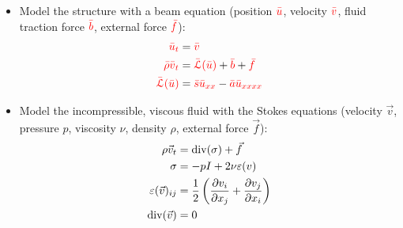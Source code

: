 \documentclass[
paperwidth=48in,paperheight=36in,
fontscale=0.4
]{baposter}
\begin{document}
\begin{poster}
{\begin{center}
\end{center}

\begin{itemize}
    \item Model the structure with a beam equation (position \({\color{red} \bar{u}}\),
          velocity \({\color{red} \bar{v}}\), fluid traction force \({\color{red} \bar{b}}\), external
          force \({\color{red} \bar{f}}\)):
          \begin{align*}
              {\color{red} \bar{u}}_{\color{red}t}              &= {\color{red} \bar{v}}              \\
              {\color{red} \bar{\rho}} {\color{red} \bar{v}}_{\color{red}t} &= {\color{red} \bar{\mathcal{L}}(\bar{u})} +
              {\color{red} \bar{b}} + {\color{red} \bar{f}}                                           \\
              {\color{red} \bar{\mathcal{L}}(\bar{u})}  &= {\color{red} \bar{s}} {\color{red} \bar{u}}_{\color{red}xx}
              - {\color{red} \bar{a}} {\color{red} \bar{u}}_{\color{red}xxxx}
          \end{align*}

    \item Model the incompressible, viscous fluid with the Stokes equations
          (velocity \(\vec{v}\), pressure \(p\), viscosity \(\nu\), density
          \(\rho\), external force \(\vec{f}\)):
          \begin{align*}
              \rho \vec{v}_t &= \mathrm{div}(\sigma) + \vec{f}                 \\
              \sigma &= -p I + 2 \nu \varepsilon(v)                           \\
              \varepsilon(\vec{v})_{ij} &= \dfrac{1}{2}
              \left(
              \dfrac{\partial v_i}{\partial x_j} +
              \dfrac{\partial v_j}{\partial x_i}
              \right)                                                         \\
              \mathrm{div}(\vec{v}) &= 0
          \end{align*}


\end{itemize}}
\end{poster}
\end{document}

